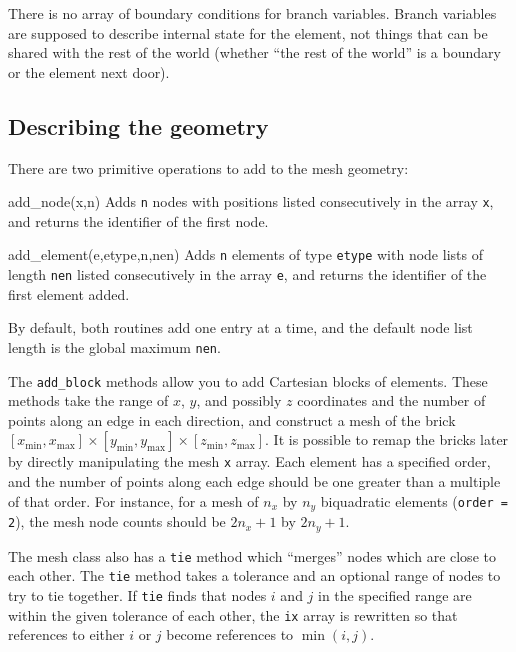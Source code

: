 \documentclass{article}
\newenvironment{codelist}[1][\quad]%
  {\begin{list}{}{%
   \settowidth{\labelwidth}{\texttt{#1}\hfil}%
   \setlength{\leftmargin}{\labelwidth}%
   \addtolength{\leftmargin}{\labelsep}%
   \addtolength{\leftmargin}{\parindent}%
   \renewcommand{\makelabel}[1]{\texttt{##1}}}}%
  {\end{list}}
\newcommand{\ttt}[1]{\texttt{#1}}
\begin{document}
There is no array of boundary conditions for branch variables.  Branch
variables are supposed to describe internal state for the element, not
things that can be shared with the rest of the world (whether ``the
rest of the world'' is a boundary or the element next door).


\subsection{Describing the geometry}
\label{section-geometry-description}

There are two primitive operations to add to the mesh geometry:
\begin{codelist}

  \item[add\_node(x,n)]
    Adds \ttt{n} nodes with positions listed consecutively in the
    array \ttt{x}, and returns the identifier of the first node.

  \item[add\_element(e,etype,n,nen)]
    Adds \ttt{n} elements of type \ttt{etype} with node lists of
    length \ttt{nen} listed consecutively in the array \ttt{e},
    and returns the identifier of the first element added.

\end{codelist}
By default, both routines add one entry at a time, and the
default node list length is the global maximum \ttt{nen}.

The \ttt{add\_block} methods allow you to add Cartesian blocks of
elements.  These methods take the range of $x$, $y$, and possibly $z$
coordinates and the number of points along an edge in each direction,
and construct a mesh of the brick $[x_{\min}, x_{\max}] \times
[y_{\min}, y_{\max}] \times [z_{\min}, z_{\max}]$.  It is possible to
remap the bricks later by directly manipulating the mesh \ttt{x}
array.  Each element has a specified order, and the number of points
along each edge should be one greater than a multiple of that order.
For instance, for a mesh of $n_x$ by $n_y$ biquadratic elements
(\ttt{order = 2}), the mesh node counts should be $2n_x + 1$ by
$2n_y + 1$.

The mesh class also has a \ttt{tie} method which ``merges'' nodes
which are close to each other.  The \ttt{tie} method takes a
tolerance and an optional range of nodes to try to tie together.  If
\ttt{tie} finds that nodes $i$ and $j$ in the specified range are
within the given tolerance of each other, the \ttt{ix} array is
rewritten so that references to either $i$ or $j$ become references to
$\min(i,j)$.
\end{document}
